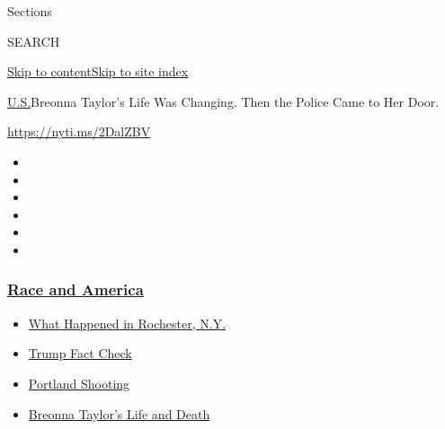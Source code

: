 Sections

SEARCH

\protect\hyperlink{site-content}{Skip to
content}\protect\hyperlink{site-index}{Skip to site index}

\href{/section/us}{U.S.}\textbar{}Breonna Taylor's Life Was Changing.
Then the Police Came to Her Door.

\url{https://nyti.ms/2DalZBV}

\begin{itemize}
\item
\item
\item
\item
\item
\item
\end{itemize}

\hypertarget{race-and-america}{%
\subsubsection{\texorpdfstring{\href{https://www.nytimes3xbfgragh.onion/news-event/george-floyd-protests-minneapolis-new-york-los-angeles?name=styln-george-floyd\&region=TOP_BANNER\&block=storyline_menu_recirc\&action=click\&pgtype=Article\&impression_id=d32e8a40-f28b-11ea-9053-47b0a289f4a9\&variant=undefined}{Race
and America}}{Race and America}}\label{race-and-america}}

\begin{itemize}
\tightlist
\item
  \href{https://www.nytimes3xbfgragh.onion/2020/09/04/nyregion/rochester-police-daniel-prude.html?name=styln-george-floyd\&region=TOP_BANNER\&block=storyline_menu_recirc\&action=click\&pgtype=Article\&impression_id=d32eb150-f28b-11ea-9053-47b0a289f4a9\&variant=undefined}{What
  Happened in Rochester, N.Y.}
\item
  \href{https://www.nytimes3xbfgragh.onion/2020/09/01/us/politics/trump-fact-check-protests.html?name=styln-george-floyd\&region=TOP_BANNER\&block=storyline_menu_recirc\&action=click\&pgtype=Article\&impression_id=d32eb151-f28b-11ea-9053-47b0a289f4a9\&variant=undefined}{Trump
  Fact Check}
\item
  \href{https://www.nytimes3xbfgragh.onion/2020/08/30/us/portland-shooting-explained.html?name=styln-george-floyd\&region=TOP_BANNER\&block=storyline_menu_recirc\&action=click\&pgtype=Article\&impression_id=d32eb152-f28b-11ea-9053-47b0a289f4a9\&variant=undefined}{Portland
  Shooting}
\item
  \href{https://www.nytimes3xbfgragh.onion/2020/08/30/us/breonna-taylor-police-killing.html?name=styln-george-floyd\&region=TOP_BANNER\&block=storyline_menu_recirc\&action=click\&pgtype=Article\&impression_id=d32eb153-f28b-11ea-9053-47b0a289f4a9\&variant=undefined}{Breonna
  Taylor's Life and Death}
\end{itemize}

